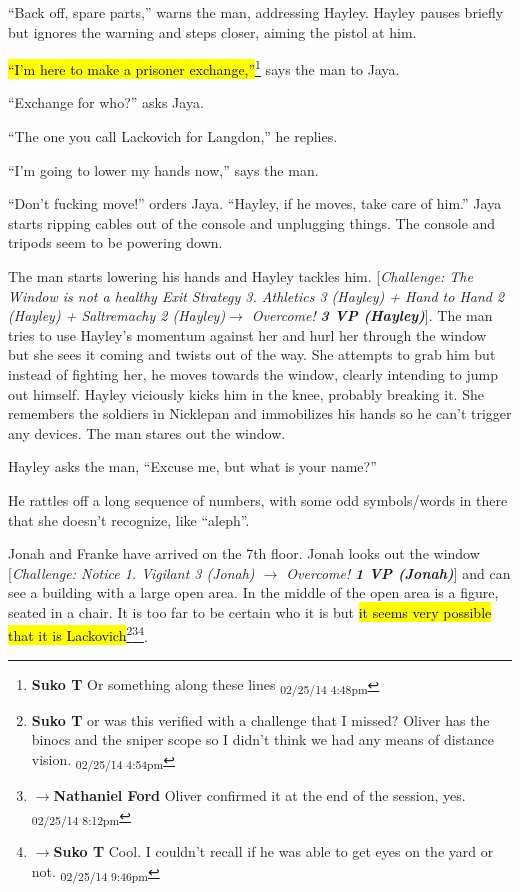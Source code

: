 ``Back off, spare parts,'' warns the man, addressing Hayley.  Hayley pauses briefly but ignores the warning and steps closer, aiming the pistol at him.



\hl{``I'm here to make a prisoner exchange,''}\footnote{\textbf{Suko T }Or something along these lines \textsubscript{02/25/14 4:48pm}} says the man to Jaya.

``Exchange for who?'' asks Jaya.

``The one you call Lackovich for Langdon,'' he replies.



``I'm going to lower my hands now,'' says the man.

``Don't fucking move!'' orders Jaya.  ``Hayley, if he moves, take care of him.''  Jaya starts ripping cables out of the console and unplugging things.  The console and tripods seem to be powering down.



The man starts lowering his hands and Hayley tackles him.  {[}\textit{Challenge: The Window is not a healthy Exit Strategy 3. Athletics 3 (Hayley) + Hand to Hand 2 (Hayley) + Saltremachy 2 (Hayley)$\rightarrow$ Overcome! }\textit{\textbf{3 VP (Hayley)}}{]}.  The man tries to use Hayley's momentum against her and hurl her through the window but she sees it coming and twists out of the way.  She attempts to grab him but instead of fighting her, he moves towards the window, clearly intending to jump out himself.  Hayley viciously kicks him in the knee, probably breaking it.  She remembers the soldiers in Nicklepan and immobilizes his hands so he can't trigger any devices.  The man stares out the window.



Hayley asks the man, ``Excuse me, but what is your name?''

He rattles off a long sequence of numbers, with some odd symbols/words in there that she doesn't recognize, like ``aleph''.  



Jonah and Franke have arrived on the 7th floor.  Jonah looks out the window {[}\textit{Challenge: Notice 1. Vigilant 3 (Jonah)  $\rightarrow$ Overcome! }\textit{\textbf{1 VP (Jonah)}}{]} and can see a building with a large open area.  In the middle of the open area is a figure, seated in a chair.  It is too far to be certain who it is but \hl{it seems very possible that it is Lackovich}\footnote{\textbf{Suko T }or was this verified with a challenge that I missed?  Oliver has the binocs and the sniper scope so I didn't think we had any means of distance vision. \textsubscript{02/25/14 4:54pm}}\footnote{$\rightarrow$\textbf{Nathaniel Ford }Oliver confirmed it at the end of the session, yes. \textsubscript{02/25/14 8:12pm}}\footnote{$\rightarrow$\textbf{Suko T }Cool.  I couldn't recall if he was able to get eyes on the yard or not. \textsubscript{02/25/14 9:46pm}}.



